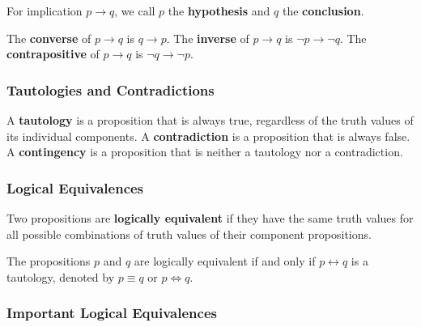 \documentclass[a4paper,12pt]{article}
\begin{document}
For implication $p \rightarrow q$, we call $p$ the \textbf{hypothesis} and $q$ the \textbf{conclusion}.

The \textbf{converse} of $p \rightarrow q$ is $q \rightarrow p$.
The \textbf{inverse} of $p \rightarrow q$ is $\neg p \rightarrow \neg q$.
The \textbf{contrapositive} of $p \rightarrow q$ is $\neg q \rightarrow \neg p$.

\subsubsection{Tautologies and Contradictions}

A \textbf{tautology} is a proposition that is always true, regardless of the truth values of its individual components.
A \textbf{contradiction} is a proposition that is always false.
A \textbf{contingency} is a proposition that is neither a tautology nor a contradiction.

\subsubsection{Logical Equivalences}

Two propositions are \textbf{logically equivalent} if they have the same truth values for all possible combinations of truth values of their component propositions.

The propositions $p$ and $q$ are logically equivalent if and only if $p \leftrightarrow q$ is a tautology, denoted by $p \equiv q$ or $p \Leftrightarrow q$.

\subsubsection{Important Logical Equivalences}
\end{document}

